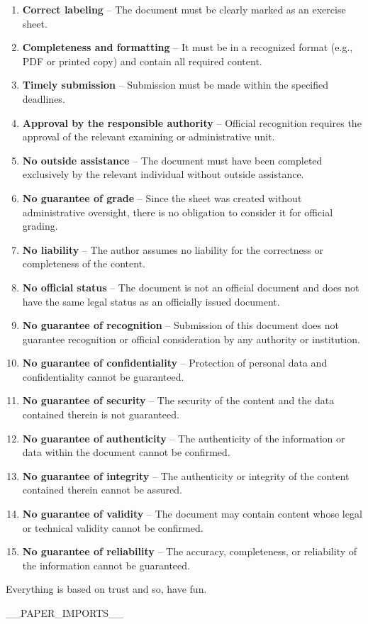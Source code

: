 \documentclass{banko}
\begin{document}
\begin{enumerate}

\item \textbf{Correct labeling} – The document must be clearly marked as an exercise sheet.

\item \textbf{Completeness and formatting} – It must be in a recognized format (e.g., PDF or printed copy) and contain all required content.

\item \textbf{Timely submission} – Submission must be made within the specified deadlines.

\item \textbf{Approval by the responsible authority} – Official recognition requires the approval of the relevant examining or administrative unit.

\item \textbf{No outside assistance} – The document must have been completed exclusively by the relevant individual without outside assistance.

\item \textbf{No guarantee of grade} – Since the sheet was created without administrative oversight, there is no obligation to consider it for official grading.

\item \textbf{No liability} – The author assumes no liability for the correctness or completeness of the content.

\item \textbf{No official status} – The document is not an official document and does not have the same legal status as an officially issued document.

\item \textbf{No guarantee of recognition} – Submission of this document does not guarantee recognition or official consideration by any authority or institution.

\item \textbf{No guarantee of confidentiality} – Protection of personal data and confidentiality cannot be guaranteed.

\item \textbf{No guarantee of security} – The security of the content and the data contained therein is not guaranteed.

\item \textbf{No guarantee of authenticity} – The authenticity of the information or data within the document cannot be confirmed.

\item \textbf{No guarantee of integrity} – The authenticity or integrity of the content contained therein cannot be assured.

\item \textbf{No guarantee of validity} – The document may contain content whose legal or technical validity cannot be confirmed.

\item \textbf{No guarantee of reliability} – The accuracy, completeness, or reliability of the information cannot be guaranteed.

\end{enumerate}

Everything is based on trust and so, have fun.

__PAPER_IMPORTS__

\newpage
\end{document}
